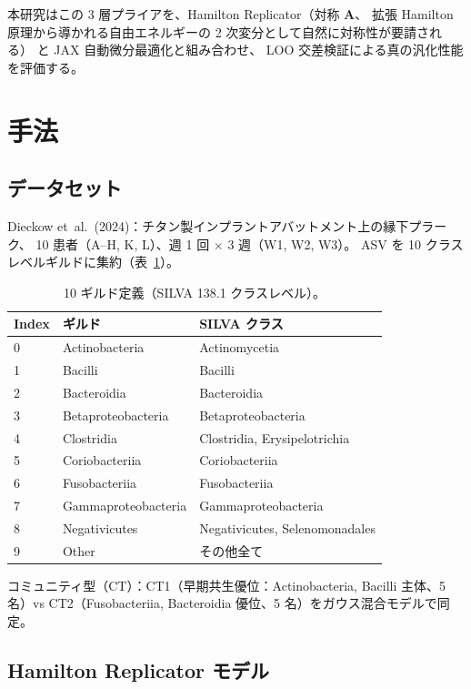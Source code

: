 \documentclass[10pt,a4paper]{article}
\newcommand{\bA}{\mathbf{A}}
\begin{document}
本研究はこの 3 層プライアを、Hamilton Replicator（対称 $\bA$、
拡張 Hamilton 原理から導かれる自由エネルギーの 2 次変分として自然に対称性が要請される）
と JAX 自動微分最適化と組み合わせ、
LOO 交差検証による真の汎化性能を評価する。

\section{手法}

\subsection{データセット}

Dieckow et~al.~(2024)：チタン製インプラントアバットメント上の縁下プラーク、
10 患者（A--H, K, L）、週 1 回 $\times$ 3 週（W1, W2, W3）。
ASV を 10 クラスレベルギルドに集約（表~\ref{tab:guilds}）。

\begin{table}[H]
\centering\small
\caption{10 ギルド定義（SILVA 138.1 クラスレベル）。}
\label{tab:guilds}
\begin{tabular}{lll}
\toprule
Index & ギルド & SILVA クラス \\
\midrule
0 & Actinobacteria      & Actinomycetia \\
1 & Bacilli             & Bacilli \\
2 & Bacteroidia         & Bacteroidia \\
3 & Betaproteobacteria  & Betaproteobacteria \\
4 & Clostridia          & Clostridia, Erysipelotrichia \\
5 & Coriobacteriia      & Coriobacteriia \\
6 & Fusobacteriia       & Fusobacteriia \\
7 & Gammaproteobacteria & Gammaproteobacteria \\
8 & Negativicutes       & Negativicutes, Selenomonadales \\
9 & Other               & その他全て \\
\bottomrule
\end{tabular}
\end{table}

コミュニティ型（CT）：CT1（早期共生優位：Actinobacteria, Bacilli 主体、5 名）vs
CT2（Fusobacteriia, Bacteroidia 優位、5 名）をガウス混合モデルで同定。

\subsection{Hamilton Replicator モデル}
\end{document}
